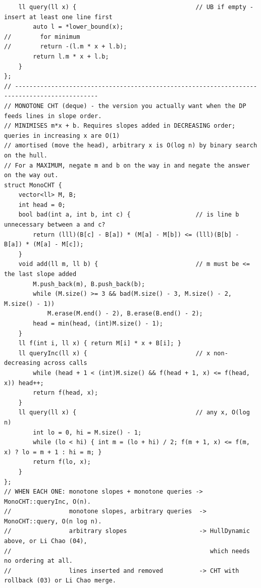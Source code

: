 \documentclass[9pt,a4paper,twocolumn]{extarticle}
\begin{document}
\begin{lstlisting}
    ll query(ll x) {                                 // UB if empty - insert at least one line first
        auto l = *lower_bound(x);
//        for minimum
//        return -(l.m * x + l.b);
        return l.m * x + l.b;
    }
};
// ---------------------------------------------------------------------------------------------
// MONOTONE CHT (deque) - the version you actually want when the DP feeds lines in slope order.
// MINIMISES m*x + b. Requires slopes added in DECREASING order; queries in increasing x are O(1)
// amortised (move the head), arbitrary x is O(log n) by binary search on the hull.
// For a MAXIMUM, negate m and b on the way in and negate the answer on the way out.
struct MonoCHT {
    vector<ll> M, B;
    int head = 0;
    bool bad(int a, int b, int c) {                  // is line b unnecessary between a and c?
        return (lll)(B[c] - B[a]) * (M[a] - M[b]) <= (lll)(B[b] - B[a]) * (M[a] - M[c]);
    }
    void add(ll m, ll b) {                           // m must be <= the last slope added
        M.push_back(m), B.push_back(b);
        while (M.size() >= 3 && bad(M.size() - 3, M.size() - 2, M.size() - 1))
            M.erase(M.end() - 2), B.erase(B.end() - 2);
        head = min(head, (int)M.size() - 1);
    }
    ll f(int i, ll x) { return M[i] * x + B[i]; }
    ll queryInc(ll x) {                              // x non-decreasing across calls
        while (head + 1 < (int)M.size() && f(head + 1, x) <= f(head, x)) head++;
        return f(head, x);
    }
    ll query(ll x) {                                 // any x, O(log n)
        int lo = 0, hi = M.size() - 1;
        while (lo < hi) { int m = (lo + hi) / 2; f(m + 1, x) <= f(m, x) ? lo = m + 1 : hi = m; }
        return f(lo, x);
    }
};
// WHEN EACH ONE: monotone slopes + monotone queries -> MonoCHT::queryInc, O(n).
//                monotone slopes, arbitrary queries  -> MonoCHT::query, O(n log n).
//                arbitrary slopes                    -> HullDynamic above, or Li Chao (04),
//                                                       which needs no ordering at all.
//                lines inserted and removed          -> CHT with rollback (03) or Li Chao merge.
\end{lstlisting}

\filbreak
\end{document}
